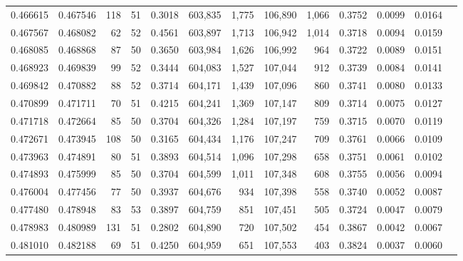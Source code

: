 \begin{tabular}{rrrrrrrrrrrrr}
0.466615 & 0.467546 &   118 &  51 &                                     0.3018 & 603,835 &   1,775 & 106,890 &   1,066 & 0.3752 & 0.0099 & 0.0164 \\
0.467567 & 0.468082 &    62 &  52 &                                     0.4561 & 603,897 &   1,713 & 106,942 &   1,014 & 0.3718 & 0.0094 & 0.0159 \\
0.468085 & 0.468868 &    87 &  50 &                                     0.3650 & 603,984 &   1,626 & 106,992 &     964 & 0.3722 & 0.0089 & 0.0151 \\
0.468923 & 0.469839 &    99 &  52 &                                     0.3444 & 604,083 &   1,527 & 107,044 &     912 & 0.3739 & 0.0084 & 0.0141 \\
0.469842 & 0.470882 &    88 &  52 &                                     0.3714 & 604,171 &   1,439 & 107,096 &     860 & 0.3741 & 0.0080 & 0.0133 \\
0.470899 & 0.471711 &    70 &  51 &                                     0.4215 & 604,241 &   1,369 & 107,147 &     809 & 0.3714 & 0.0075 & 0.0127 \\
0.471718 & 0.472664 &    85 &  50 &                                     0.3704 & 604,326 &   1,284 & 107,197 &     759 & 0.3715 & 0.0070 & 0.0119 \\
0.472671 & 0.473945 &   108 &  50 &                                     0.3165 & 604,434 &   1,176 & 107,247 &     709 & 0.3761 & 0.0066 & 0.0109 \\
0.473963 & 0.474891 &    80 &  51 &                                     0.3893 & 604,514 &   1,096 & 107,298 &     658 & 0.3751 & 0.0061 & 0.0102 \\
0.474893 & 0.475999 &    85 &  50 &                                     0.3704 & 604,599 &   1,011 & 107,348 &     608 & 0.3755 & 0.0056 & 0.0094 \\
0.476004 & 0.477456 &    77 &  50 &                                     0.3937 & 604,676 &     934 & 107,398 &     558 & 0.3740 & 0.0052 & 0.0087 \\
0.477480 & 0.478948 &    83 &  53 &                                     0.3897 & 604,759 &     851 & 107,451 &     505 & 0.3724 & 0.0047 & 0.0079 \\
0.478983 & 0.480989 &   131 &  51 &                                     0.2802 & 604,890 &     720 & 107,502 &     454 & 0.3867 & 0.0042 & 0.0067 \\
0.481010 & 0.482188 &    69 &  51 &                                     0.4250 & 604,959 &     651 & 107,553 &     403 & 0.3824 & 0.0037 & 0.0060 \\

\end{tabular}
